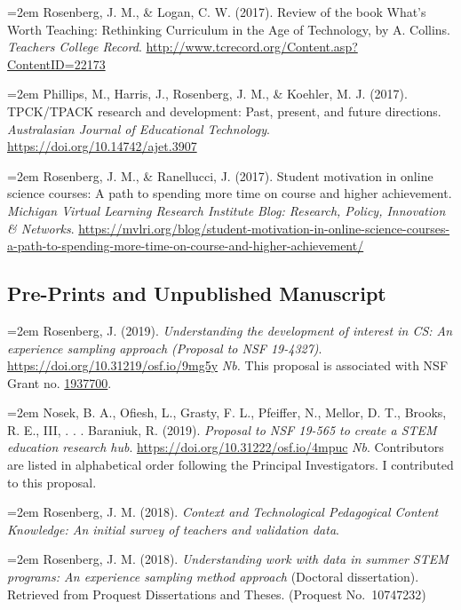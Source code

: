 \documentclass[
  14,
]{article}
\begin{document}
\hangindent=2em Rosenberg, J. M., \& Logan, C. W. (2017). Review of the
book What's Worth Teaching: Rethinking Curriculum in the Age of
Technology, by A. Collins. \emph{Teachers College Record}.
\url{http://www.tcrecord.org/Content.asp?ContentID=22173}

\hangindent=2em Phillips, M., Harris, J., Rosenberg, J. M., \& Koehler,
M. J. (2017). TPCK/TPACK research and development: Past, present, and
future directions. \emph{Australasian Journal of Educational
Technology}. \url{https://doi.org/10.14742/ajet.3907}

\hangindent=2em Rosenberg, J. M., \& Ranellucci, J. (2017). Student
motivation in online science courses: A path to spending more time on
course and higher achievement. \emph{Michigan Virtual Learning Research
Institute Blog: Research, Policy, Innovation \& Networks}.
\url{https://mvlri.org/blog/student-motivation-in-online-science-courses-a-path-to-spending-more-time-on-course-and-higher-achievement/}

\hypertarget{pre-prints-and-unpublished-manuscript}{%
\subsection{Pre-Prints and Unpublished
Manuscript}\label{pre-prints-and-unpublished-manuscript}}

\hangindent=2em Rosenberg, J. (2019). \emph{Understanding the
development of interest in CS: An experience sampling approach (Proposal
to NSF 19-4327)}. \url{https://doi.org/10.31219/osf.io/9mg5y} \emph{Nb.}
This proposal is associated with NSF Grant no.
\href{https://www.nsf.gov/awardsearch/showAward?AWD_ID=1937700\&HistoricalAwards=false}{1937700}.

\hangindent=2em Nosek, B. A., Ofiesh, L., Grasty, F. L., Pfeiffer, N.,
Mellor, D. T., Brooks, R. E., III, . . . Baraniuk, R. (2019).
\emph{Proposal to NSF 19-565 to create a STEM education research hub}.
\url{https://doi.org/10.31222/osf.io/4mpuc} \emph{Nb}. Contributors are
listed in alphabetical order following the Principal Investigators. I
contributed to this proposal.

\hangindent=2em Rosenberg, J. M. (2018). \emph{Context and Technological
Pedagogical Content Knowledge: An initial survey of teachers and
validation data}.

\hangindent=2em Rosenberg, J. M. (2018). \emph{Understanding work with
data in summer STEM programs: An experience sampling method approach}
(Doctoral dissertation). Retrieved from Proquest Dissertations and
Theses. (Proquest No.~10747232)
\end{document}
